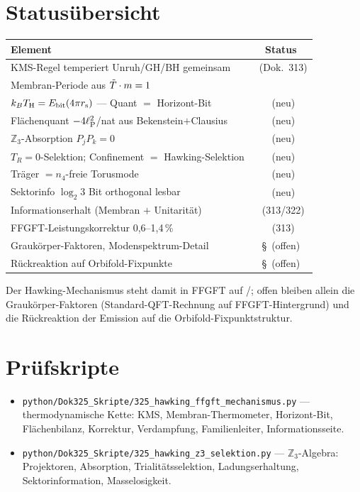 \section{Statusübersicht}

\begin{center}
\begin{tabular}{@{}lc@{}}
  \toprule
  \textbf{Element} & \textbf{Status} \\
  \midrule
  KMS-Regel temperiert Unruh/GH/BH gemeinsam & \K\ (Dok.\ 313) \\
  Membran-Periode aus $\tilde{T}\cdot m = 1$ & \K \\
  $k_BT_{\mathrm{H}} = E_{\mathrm{bit}}(4\pi r_{\mathrm{s}})$ — Quant $=$ Horizont-Bit & \K\ (neu) \\
  Flächenquant $-4\ell_{\mathrm{P}}^2$/nat aus Bekenstein$+$Clausius & \B\ (neu) \\
  $\mathbb{Z}_3$-Absorption $P_jP_k = 0$ & \B\ (neu) \\
  $T_R=0$-Selektion; Confinement $=$ Hawking-Selektion & \B\ (neu) \\
  Träger $= n_4$-freie Torusmode & \K\ (neu) \\
  Sektorinfo $\log_2 3$ Bit orthogonal lesbar & \B\ (neu) \\
  Informationserhalt (Membran $+$ Unitarität) & \K\ (313/322) \\
  FFGFT-Leistungskorrektur 0{,}6–1{,}4\,\% & \K\ (313) \\
  Graukörper-Faktoren, Modenspektrum-Detail & \S\ (offen) \\
  Rückreaktion auf Orbifold-Fixpunkte & \S\ (offen) \\
  \bottomrule
\end{tabular}
\end{center}

Der Hawking-Mechanismus steht damit in FFGFT auf \K/\B; offen bleiben
allein die Graukörper-Faktoren (Standard-QFT-Rechnung auf FFGFT-Hintergrund)
und die Rückreaktion der Emission auf die Orbifold-Fixpunktstruktur.

\section*{Prüfskripte}

\begin{itemize}
  \item \texttt{python/Dok325\_Skripte/325\_hawking\_ffgft\_mechanismus.py} —
    thermodynamische Kette: KMS, Membran-Thermometer, Horizont-Bit,
    Flächenbilanz, Korrektur, Verdampfung, Familienleiter,
    Informationsseite.
  \item \texttt{python/Dok325\_Skripte/325\_hawking\_z3\_selektion.py} —
    $\mathbb{Z}_3$-Algebra: Projektoren, Absorption, Trialitätsselektion,
    Ladungserhaltung, Sektorinformation, Masselosigkeit.
\end{itemize}

